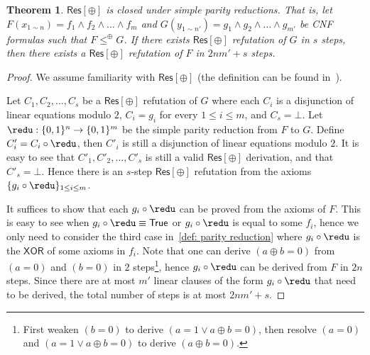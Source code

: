 \documentclass[10pt,a4paper]{article}
\newtheorem{theorem}{Theorem}[section]
\theoremstyle{definition}
\theoremstyle{remark}
\newcommand{\Res}{\mathsf{Res}}
\newcommand{\XOR}{\mathsf{XOR}}
\begin{document}
\begin{theorem}
    $\Res[\oplus]$ is closed under simple parity reductions. That is, let $F(x_{1\sim n}) = f_1\land f_2\land \dots \land f_m$ and $G(y_{1\sim {n'}}) = g_1\land g_2 \land \dots \land g_{m'}$ be CNF formulas such that $F\le^\oplus G$. If there exists $\Res[\oplus]$ refutation of $G$ in $s$ steps, then there exists a $\Res[\oplus]$ refutation of $F$ in $2nm' + s$ steps.
\end{theorem}
\begin{proof}
    We assume familiarity with $\Res[\oplus]$ (the definition can be found in~\cite{ItsyksonS20}).
    
    Let $C_1, C_2, \dots, C_s$ be a $\Res[\oplus]$ refutation of $G$ where each $C_i$ is a disjunction of linear equations modulo $2$, $C_i = g_i$ for every $1\le i\le m$, and $C_s = \bot$. Let $\redu: \{0, 1\}^n \to \{0, 1\}^m$ be the simple parity reduction from $F$ to $G$. Define $C'_i = C_i\circ \redu$, then $C'_i$ is still a disjunction of linear equations modulo $2$. It is easy to see that $C'_1, C'_2, \dots, C'_s$ is still a valid $\Res[\oplus]$ derivation, and that $C'_s = \bot$. Hence there is an $s$-step $\Res[\oplus]$ refutation from the axioms $\{g_i\circ\redu\}_{1\le i\le m}$.

    It suffices to show that each $g_i\circ\redu$ can be proved from the axioms of $F$. This is easy to see when $g_i\circ\redu\equiv {\sf True}$ or $g_i\circ\redu$ is equal to some $f_i$, hence we only need to consider the third case in~\autoref{def: parity reduction} where $g_i\circ\redu$ is the $\XOR$ of some axioms in $f_i$. Note that one can derive $(a\oplus b = 0)$ from $(a = 0)$ and $(b = 0)$ in $2$ steps\footnote{First weaken $(b = 0)$ to derive $(a = 1\lor a\oplus b = 0)$, then resolve $(a = 0)$ and $(a = 1\lor a \oplus b = 0)$ to derive $(a\oplus b = 0)$.}, hence $g_i\circ\redu$ can be derived from $F$ in $2n$ steps. Since there are at most $m'$ linear clauses of the form $g_i\circ\redu$ that need to be derived, the total number of steps is at most $2nm' + s$.
\end{proof}
\end{document}
